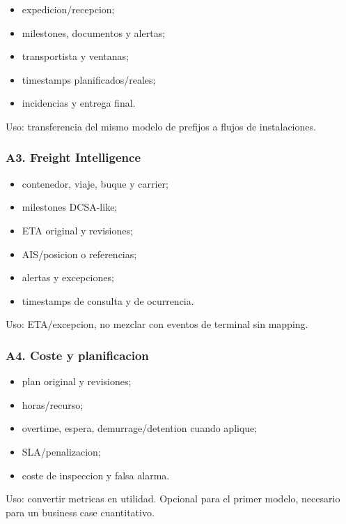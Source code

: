 \documentclass[
  spanish,
  10pt,
  a4paper,
]{article}
\providecommand{\tightlist}{%
  \setlength{\itemsep}{0pt}\setlength{\parskip}{0pt}}
\begin{document}
\begin{itemize}
\tightlist
\item
  expedicion/recepcion;
\item
  milestones, documentos y alertas;
\item
  transportista y ventanas;
\item
  timestamps planificados/reales;
\item
  incidencias y entrega final.
\end{itemize}

Uso: transferencia del mismo modelo de prefijos a flujos de
instalaciones.

\subsubsection{A3. Freight Intelligence}\label{a3-freight-intelligence}

\begin{itemize}
\tightlist
\item
  contenedor, viaje, buque y carrier;
\item
  milestones DCSA-like;
\item
  ETA original y revisiones;
\item
  AIS/posicion o referencias;
\item
  alertas y excepciones;
\item
  timestamps de consulta y de ocurrencia.
\end{itemize}

Uso: ETA/excepcion, no mezclar con eventos de terminal sin mapping.

\subsubsection{A4. Coste y
planificacion}\label{a4-coste-y-planificacion}

\begin{itemize}
\tightlist
\item
  plan original y revisiones;
\item
  horas/recurso;
\item
  overtime, espera, demurrage/detention cuando aplique;
\item
  SLA/penalizacion;
\item
  coste de inspeccion y falsa alarma.
\end{itemize}

Uso: convertir metricas en utilidad. Opcional para el primer modelo,
necesario para un business case cuantitativo.
\end{document}
